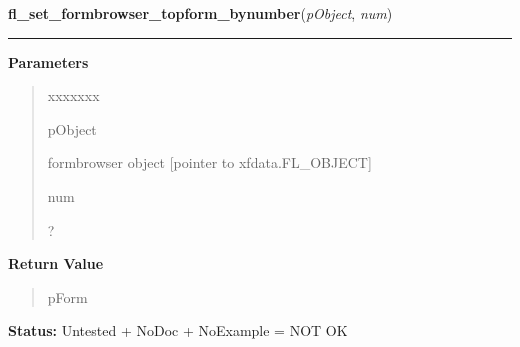\hspace{.8\funcindent}\begin{boxedminipage}{\funcwidth}

    \raggedright \textbf{fl\_set\_formbrowser\_topform\_bynumber}(\textit{pObject}, \textit{num})

    \vspace{-1.5ex}

    \rule{\textwidth}{0.5\fboxrule}
\setlength{\parskip}{2ex}
\setlength{\parskip}{1ex}
      \textbf{Parameters}
      \vspace{-1ex}

      \begin{quote}
        \begin{Ventry}{xxxxxxx}

          \item[pObject]

          formbrowser object [pointer to xfdata.FL\_OBJECT]

          \item[num]

          ?

        \end{Ventry}

      \end{quote}

      \textbf{Return Value}
    \vspace{-1ex}

      \begin{quote}
      pForm

      \end{quote}

\textbf{Status:} Untested + NoDoc + NoExample = NOT OK



    \end{boxedminipage}

    \label{xformslib:library:fl_set_formbrowser_xoffset}

    \vspace{0.5ex}

